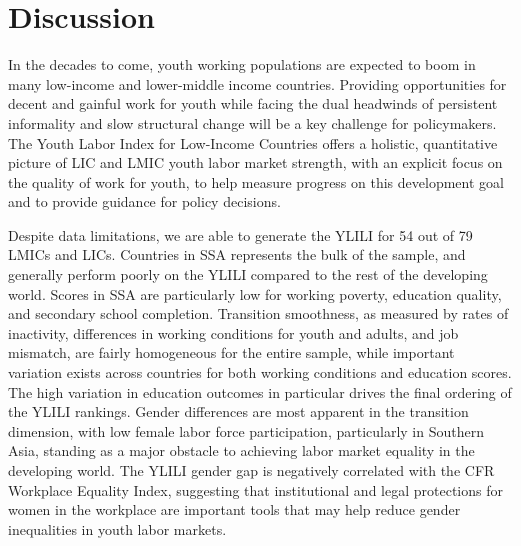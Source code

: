 \documentclass[
  a4paper, twoside, 12pt]{book}
\begin{document}
\hypertarget{discussion}{%
\section{Discussion}\label{discussion}}

In the decades to come, youth working populations are expected to boom in many low-income and lower-middle income countries. Providing opportunities for decent and gainful work for youth while facing the dual headwinds of persistent informality and slow structural change will be a key challenge for policymakers. The Youth Labor Index for Low-Income Countries offers a holistic, quantitative picture of LIC and LMIC youth labor market strength, with an explicit focus on the quality of work for youth, to help measure progress on this development goal and to provide guidance for policy decisions.

Despite data limitations, we are able to generate the YLILI for 54 out of 79 LMICs and LICs. Countries in SSA represents the bulk of the sample, and generally perform poorly on the YLILI compared to the rest of the developing world. Scores in SSA are particularly low for working poverty, education quality, and secondary school completion. Transition smoothness, as measured by rates of inactivity, differences in working conditions for youth and adults, and job mismatch, are fairly homogeneous for the entire sample, while important variation exists across countries for both working conditions and education scores. The high variation in education outcomes in particular drives the final ordering of the YLILI rankings. Gender differences are most apparent in the transition dimension, with low female labor force participation, particularly in Southern Asia, standing as a major obstacle to achieving labor market equality in the developing world. The YLILI gender gap is negatively correlated with the CFR Workplace Equality Index, suggesting that institutional and legal protections for women in the workplace are important tools that may help reduce gender inequalities in youth labor markets.
\end{document}
